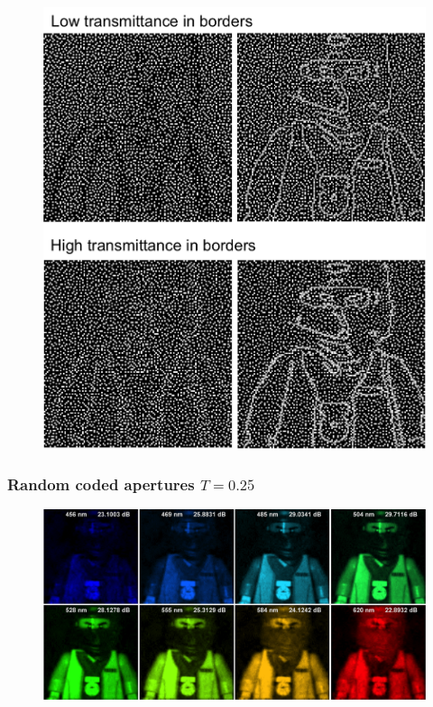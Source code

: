 \documentclass{beamer}
\begin{document}

\begin{frame}

\begin{figure}
\centering
\includegraphics[scale=0.5]{FiguresUpd/bordersCode.png}
\end{figure}
\end{frame}


\begin{frame}
\frametitle{Random coded apertures $T=0.25$}

\begin{figure}
\centering
\includegraphics[scale=0.30]{FiguresUpd/Sim_rand025.png}
\end{figure}
\end{frame}
\end{document}
